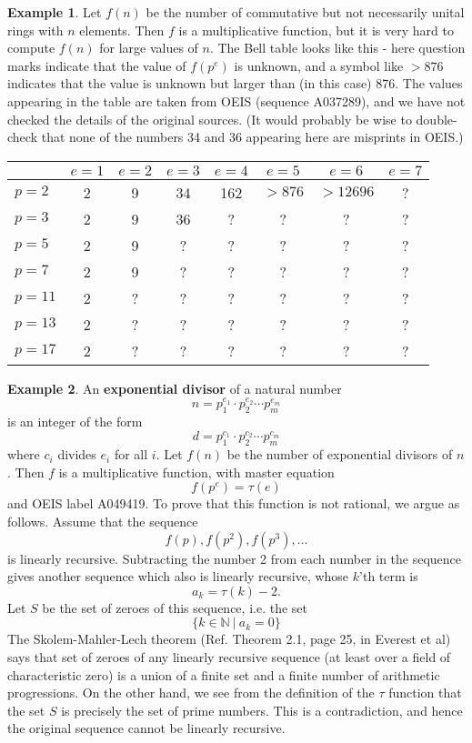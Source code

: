 \documentclass[a4paper]{article}
\theoremstyle{definition}
\newtheorem{example}{Example}[section]
\theoremstyle{remark}
\newcommand{\defhl}[1]{\textbf{#1}}
\begin{document}
\begin{example}
Let $f(n)$ be the number of commutative but not necessarily unital rings with $n$ elements. Then $f$ is a multiplicative function, but it is very hard to compute $f(n)$ for large values of $n$. The Bell table looks like this - here question marks indicate that the value of $f(p^e)$ is unknown, and a symbol like $>876$ indicates that the value is unknown but larger than (in this case) 876. The values appearing in the table are taken from OEIS (sequence A037289), and we have not checked the details of the original sources. (It would probably be wise to double-check that none of the numbers 34 and 36 appearing here are misprints in OEIS.)

\begin{center}
\begin{tabular}{| l | | c | c | c | c | c | c | c |}
\hline
& $e = 1$ & $e = 2$ & $e = 3$ & $e = 4$ & $e = 5$ & $e = 6$ & $e=7$ \\
\hline
\hline
$p = 2$ & 2 & 9 & 34 & 162 & $>876$ & $>12696$  & ? \\
\hline
$p = 3$ & 2 & 9 & 36 & ? & ? & ? & ? \\
\hline
$p = 5$ & 2 & 9 & ? & ? & ? & ?  & ?\\
\hline
$p = 7$ & 2 & 9 & ? & ? & ? & ?  & ?\\
\hline
$p = 11$ & 2 & ? & ? & ? & ? & ?  & ?\\
\hline
$p = 13$ & 2 & ? & ? & ? & ? & ?  & ?\\
\hline
$p = 17$ & 2 & ? & ? & ? & ? & ?  & ?\\

\hline
\end{tabular}
\end{center}
\end{example}


\begin{example}
An \defhl{exponential divisor} of a natural number 
$$n = p_1^{e_1} \cdot p_2^{e_2} \cdots p_m^{e_m}$$
is an integer of the form
$$ d = p_1^{c_1} \cdot p_2^{c_2} \cdots p_m^{c_m}   $$
where $c_i$ divides $e_i$ for all $i$. Let $f(n)$ be the number of exponential divisors of $n$. Then $f$ is a multiplicative function, with master equation
$$f(p^e) = \tau(e)$$
and OEIS label A049419. To prove that this function is not rational, we argue as follows. Assume that the sequence 
$$ f(p), f(p^2), f(p^3), \ldots   $$
is linearly recursive. Subtracting the number 2 from each number in the sequence gives another sequence which also is linearly recursive, whose $k$'th term is 
$$  a_k = \tau(k) - 2.  $$
Let $S$ be the set of zeroes of this sequence, i.e. the set 
$$ \{ k \in \mathbb{N}  \ \vert \ a_k = 0  \}  $$
The Skolem-Mahler-Lech theorem (Ref. Theorem 2.1, page 25, in Everest et al) says that set of zeroes of any linearly recursive sequence (at least over a field of characteristic zero) is a union of a finite set and a finite number of arithmetic progressions. On the other hand, we see from the definition of the $\tau$ function that the set $S$ is precisely the set of prime numbers. This is a contradiction, and hence the original sequence cannot be linearly recursive.
\end{example}
\end{document}
